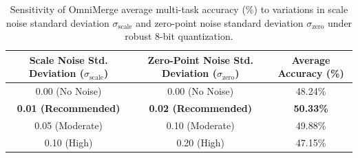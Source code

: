\documentclass{article}
\theoremstyle{plain}
\theoremstyle{definition}
\theoremstyle{remark}
\begin{document}
\begin{table}[h]
\caption{Sensitivity of OmniMerge average multi-task accuracy (\%) to variations in scale noise standard deviation $\sigma_{\text{scale}}$ and zero-point noise standard deviation $\sigma_{\text{zero}}$ under robust 8-bit quantization.}
\label{tab:noise_sensitivity}
\vskip 0.15in
\begin{center}
\begin{small}
\begin{sc}
\begin{tabular}{ccc}
\toprule
Scale Noise Std. Deviation ($\sigma_{\text{scale}}$) & Zero-Point Noise Std. Deviation ($\sigma_{\text{zero}}$) & Average Accuracy (\%) \\
\midrule
0.00 (No Noise) & 0.00 (No Noise) & 48.24\% \\
\textbf{0.01 (Recommended)} & \textbf{0.02 (Recommended)} & \textbf{50.33\%} \\
0.05 (Moderate) & 0.10 (Moderate) & 49.88\% \\
0.10 (High) & 0.20 (High) & 47.15\% \\
\bottomrule
\end{tabular}
\end{sc}
\end{small}
\end{center}
\vskip -0.1in
\end{table}
\end{document}
